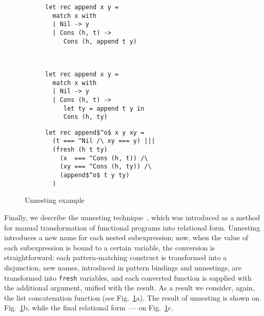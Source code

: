\begin{figure}[t]
  \centering
  \begin{subfigure}[t]{0.4\textwidth}
    \centering
\begin{lstlisting}
let rec append x y =
  match x with
  | Nil -> y
  | Cons (h, t) ->
     Cons (h, append t y)     
\end{lstlisting}
\caption{}
  \end{subfigure}
  ~
  \begin{subfigure}[t]{0.4\textwidth}
        \centering
\begin{lstlisting}
let rec append x y =
  match x with 
  | Nil -> y
  | Cons (h, t) -> 
     let ty = append t y in
     Cons (h, ty)
\end{lstlisting}
\vspace{-1\baselineskip}
\caption{}
  \end{subfigure}
  \vskip2mm
  \begin{subfigure}[t]{0.4\textwidth}
        \centering
\begin{lstlisting}
let rec append$^o$ x y xy =
  (t === ^Nil /\ xy === y) |||
  (fresh (h t ty)
    (x  === ^Cons (h, t)) /\
    (xy === ^Cons (h, ty)) /\
    (append$^o$ t y ty)
  )
\end{lstlisting}
\vspace{-1\baselineskip}
\caption{}
  \end{subfigure}
  \vskip4mm
\caption{Unnesting example}
\label{unnesting_example}
\end{figure}

Finally, we describe the unnesting technique~\cite{TRS}, which was introduced as a method for manual transformation
of functional programs into relational form. Unnesting introduces a new name for each nested subexpression; now, when the value of
each subexpression is bound to a certain variable, the conversion is straightforward: each pattern-matching construct is
transformed into a disjunction, new names, introduced in pattern bindings and unnestings, are transformed into \lstinline|fresh| variables, and
each converted function is supplied with the additional argument, unified with the result. As a result we consider, again, the list
concatenation function (see Fig.~\ref{unnesting_example}a). The result of unnesting is shown on Fig.~\ref{unnesting_example}b, while the
final relational form~--- on Fig.~\ref{unnesting_example}c.

